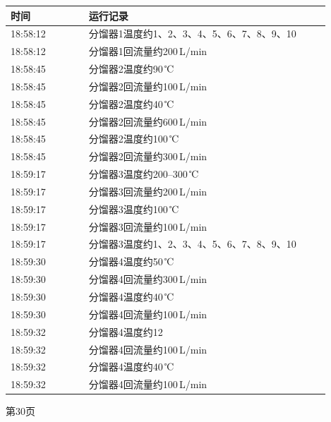 \documentclass[UTF8,10pt,a4paper,fontset=fandol]{ctexart}
\begin{document}
\begin{center}
\begin{minipage}[t]{0.46\linewidth}
\medskip
\begin{tabular}{|p{0.22\linewidth}|p{0.68\linewidth}|}
\hline
时间 & 运行记录 \\ \hline
18:58:12 & 分馏器1温度约1、2、3、4、5、6、7、8、9、10 \\ \hline
18:58:12 & 分馏器1回流量约200\,L/min \\ \hline
18:58:45 & 分馏器2温度约90\,℃ \\ \hline
18:58:45 & 分馏器2回流量约100\,L/min \\ \hline
18:58:45 & 分馏器2温度约40\,℃ \\ \hline
18:58:45 & 分馏器2回流量约600\,L/min \\ \hline
18:58:45 & 分馏器2温度约100\,℃ \\ \hline
18:58:45 & 分馏器2回流量约300\,L/min \\ \hline
18:59:17 & 分馏器3温度约200--300\,℃ \\ \hline
18:59:17 & 分馏器3回流量约200\,L/min \\ \hline
18:59:17 & 分馏器3温度约100\,℃ \\ \hline
18:59:17 & 分馏器3回流量约100\,L/min \\ \hline
18:59:17 & 分馏器3温度约1、2、3、4、5、6、7、8、9、10 \\ \hline
18:59:30 & 分馏器4温度约50\,℃ \\ \hline
18:59:30 & 分馏器4回流量约300\,L/min \\ \hline
18:59:30 & 分馏器4温度约40\,℃ \\ \hline
18:59:30 & 分馏器4回流量约100\,L/min \\ \hline
18:59:32 & 分馏器4温度约12 \\ \hline
18:59:32 & 分馏器4回流量约100\,L/min \\ \hline
18:59:32 & 分馏器4温度约40\,℃ \\ \hline
18:59:32 & 分馏器4回流量约100\,L/min \\ \hline
\end{tabular}

\smallskip
第30页
\end{minipage}
\end{center}

\medskip
\end{document}
